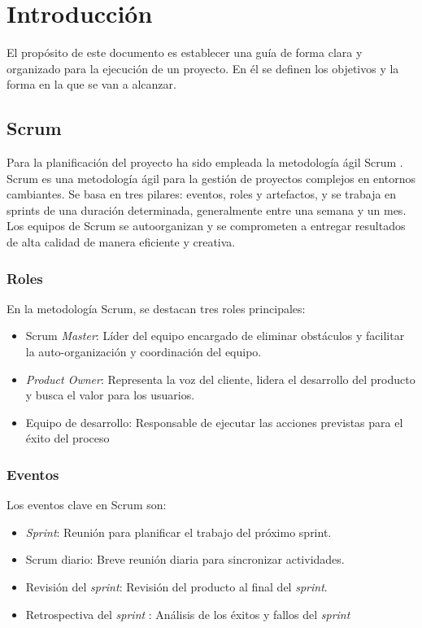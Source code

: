 
\section{Introducción}
El propósito de este documento es establecer una guía de forma clara y organizado para la ejecución de un proyecto. En él se definen los objetivos y la forma en la que se van a alcanzar.


\subsection{Scrum}
Para la planificación del proyecto ha sido empleada la metodología ágil Scrum \cite{scrumMaster2022}. Scrum es una metodología ágil para la gestión de proyectos complejos en entornos cambiantes. Se basa en tres pilares: eventos, roles y artefactos, y se trabaja en sprints de una duración determinada, generalmente entre una semana y un mes. Los equipos de Scrum se autoorganizan y se comprometen a entregar resultados de alta calidad de manera eficiente y creativa.
\subsubsection{Roles}
En la metodología Scrum, se destacan tres roles principales:

\begin{itemize}
\item Scrum \textsl{Master}: Líder del equipo encargado de eliminar obstáculos y facilitar la auto-organización y coordinación del equipo.
\item \textsl{Product Owner}: Representa la voz del cliente, lidera el desarrollo del producto y busca el valor para los usuarios.
\item Equipo de desarrollo: Responsable de ejecutar las acciones previstas para el éxito del proceso
\end{itemize}
\subsubsection{Eventos}
Los eventos clave en Scrum son:
\begin{itemize}


\item \textsl{Sprint}: Reunión para planificar el trabajo del próximo sprint.
\item Scrum diario: Breve reunión diaria para sincronizar actividades.
\item Revisión del \textsl{sprint}: Revisión del producto al final del \textsl{sprint}.
\item Retrospectiva del \textsl{sprint} : Análisis de los éxitos y fallos del \textsl{sprint}
\end{itemize}




